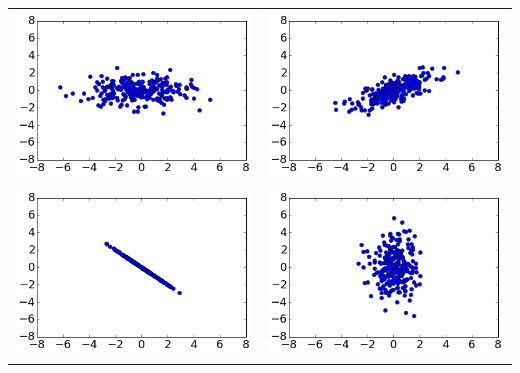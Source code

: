 \documentclass[10pt]{report}
\theoremstyle{plain}
\theoremstyle{definition}
\begin{document}
\begin{enumerate}
\begin{center}
\begin{tabular}{cc}
\includegraphics[width=3in]{data1.png}
&
\includegraphics[width=3in]{data2.png}
\\
\includegraphics[width=3in]{data3.png}
&
\includegraphics[width=3in]{data4.png}
\end{tabular}
\end{center}


\end{enumerate}
\end{document}
